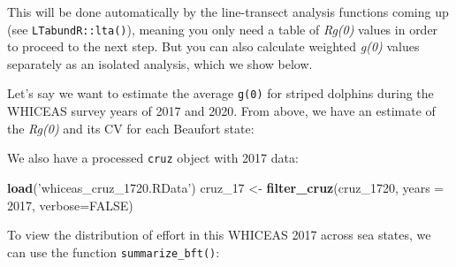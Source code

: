 \documentclass[
]{book}
\newenvironment{Shaded}{\begin{snugshade}}{\end{snugshade}}
\newcommand{\DataTypeTok}[1]{\textcolor[rgb]{0.13,0.29,0.53}{#1}}
\newcommand{\DecValTok}[1]{\textcolor[rgb]{0.00,0.00,0.81}{#1}}
\newcommand{\FloatTok}[1]{\textcolor[rgb]{0.00,0.00,0.81}{#1}}
\newcommand{\KeywordTok}[1]{\textcolor[rgb]{0.13,0.29,0.53}{\textbf{#1}}}
\newcommand{\NormalTok}[1]{#1}
\newcommand{\OperatorTok}[1]{\textcolor[rgb]{0.81,0.36,0.00}{\textbf{#1}}}
\newcommand{\OtherTok}[1]{\textcolor[rgb]{0.56,0.35,0.01}{#1}}
\newcommand{\StringTok}[1]{\textcolor[rgb]{0.31,0.60,0.02}{#1}}
\begin{document}
This will be done automatically by the line-transect analysis functions coming up (see \texttt{LTabundR::lta()}), meaning you only need a table of \emph{Rg(0)} values in order to proceed to the next step. But you can also calculate weighted \emph{g(0)} values separately as an isolated analysis, which we show below.

Let's say we want to estimate the average \texttt{g(0)} for striped dolphins during the WHICEAS survey years of 2017 and 2020. From above, we have an estimate of the \emph{Rg(0)} and its CV for each Beaufort state:

\begin{Shaded}
\end{Shaded}

We also have a processed \texttt{cruz} object with 2017 data:

\begin{Shaded}
\begin{Highlighting}[]
\KeywordTok{load}\NormalTok{(}\StringTok{'whiceas_cruz_1720.RData'}\NormalTok{)}
\NormalTok{cruz_}\DecValTok{17}\NormalTok{ <-}\StringTok{ }\KeywordTok{filter_cruz}\NormalTok{(cruz_}\DecValTok{1720}\NormalTok{, }\DataTypeTok{years =} \DecValTok{2017}\NormalTok{, }\DataTypeTok{verbose=}\OtherTok{FALSE}\NormalTok{)}
\end{Highlighting}
\end{Shaded}

To view the distribution of effort in this WHICEAS 2017 across sea states, we can use the function \texttt{summarize\_bft()}:
\end{document}
